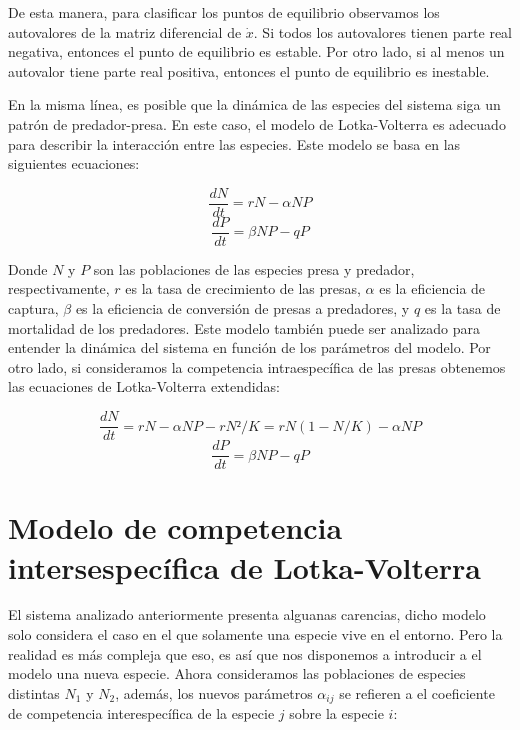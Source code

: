 \documentclass{article}
\begin{document}
De esta manera, para clasificar los puntos de equilibrio observamos los autovalores de la matriz diferencial de \(\dot{x}\). Si todos los autovalores tienen parte real negativa, entonces el punto de equilibrio es estable. Por otro lado, si al menos un autovalor tiene parte real positiva, entonces el punto de equilibrio es inestable.

En la misma línea, es posible que la dinámica de las especies del sistema siga un patrón de predador-presa. En este caso, el modelo de Lotka-Volterra es adecuado para describir la interacción entre las especies. Este modelo se basa en las siguientes ecuaciones:

\begin{equation}
\frac {dN} {dt} = rN - \alpha NP \label{eq:(1.5)}
\end{equation}
\begin{equation}
\frac {dP} {dt} = \beta NP - qP \label{eq:(1.6)}
\end{equation}

Donde \(N\) y \(P\) son las poblaciones de las especies presa y predador, respectivamente, \(r\) es la tasa de crecimiento de las presas, \(\alpha\) es la eficiencia de captura, \(\beta\) es la eficiencia de conversión de presas a predadores, y \(q\) es la tasa de mortalidad de los predadores. Este modelo también puede ser analizado para entender la dinámica del sistema en función de los parámetros del modelo.
Por otro lado, si consideramos la competencia intraespecífica de las presas obtenemos las ecuaciones de Lotka-Volterra extendidas: 

\begin{equation}
\frac {dN} {dt} = rN - \alpha NP - rN²/K = rN(1 - N/K) - \alpha NP \label{eq:(1.7)}
\end{equation}
\begin{equation}
\frac {dP} {dt} = \beta NP - qP \label{eq:(1.8)}
\end{equation}


\section{Modelo de competencia intersespecífica de Lotka-Volterra}
El sistema analizado anteriormente presenta alguanas carencias, dicho modelo solo considera el caso en el que solamente una especie vive en el entorno. Pero la realidad es más compleja 
que eso, es así que nos disponemos a introducir a el modelo una nueva especie. Ahora consideramos las poblaciones de especies distintas \(N_1\) y \(N_2\), además, los nuevos parámetros 
\(\alpha_{ij}\) se refieren a el coeficiente de competencia interespecífica de la especie \(j\) sobre la especie \(i\):
\end{document}
